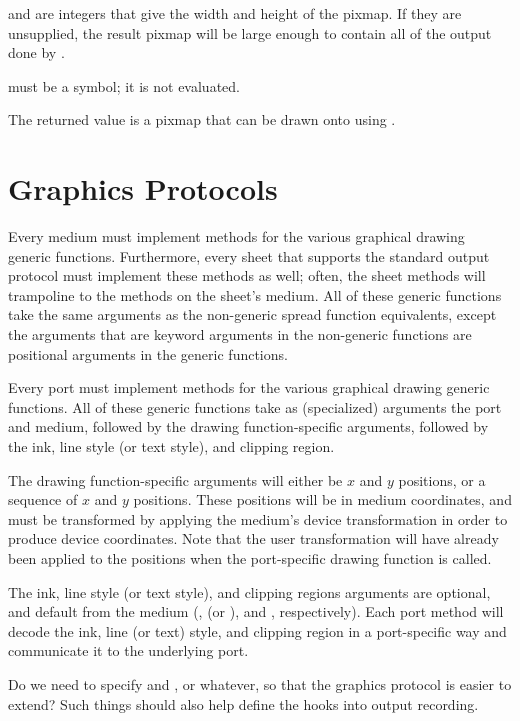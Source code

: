  and  are integers that give the width and height of the
pixmap.  If they are unsupplied, the result pixmap will be large enough to
contain all of the output done by .

 must be a symbol; it is not evaluated.

The returned value is a pixmap that can be drawn onto  using
.


\section {Graphics Protocols\label{graphics-protocols}}

Every medium must implement methods for the various graphical drawing generic
functions.  Furthermore, every sheet that supports the standard output protocol
must implement these methods as well; often, the sheet methods will trampoline
to the methods on the sheet's medium.  All of these generic functions take the
same arguments as the non-generic spread function equivalents, except the
arguments that are keyword arguments in the non-generic functions are positional
arguments in the generic functions.

Every port must implement methods for the various graphical drawing generic
functions.  All of these generic functions take as (specialized) arguments the
port and medium, followed by the drawing function-specific arguments, followed
by the ink, line style (or text style), and clipping region.

The drawing function-specific arguments will either be $x$ and $y$ positions, or
a sequence of $x$ and $y$ positions.  These positions will be in medium
coordinates, and must be transformed by applying the medium's device
transformation in order to produce device coordinates.  Note that the user
transformation will have already been applied to the positions when the
port-specific drawing function is called.

The ink, line style (or text style), and clipping regions arguments are
optional, and default from the medium (, 
(or ), and ,
respectively).  Each port method will decode the ink, line (or text) style, and
clipping region in a port-specific way and communicate it to the underlying
port.

 {Do we need to specify  and
, or whatever, so that the graphics protocol is
easier to extend?  Such things should also help define the hooks into output
recording.}

